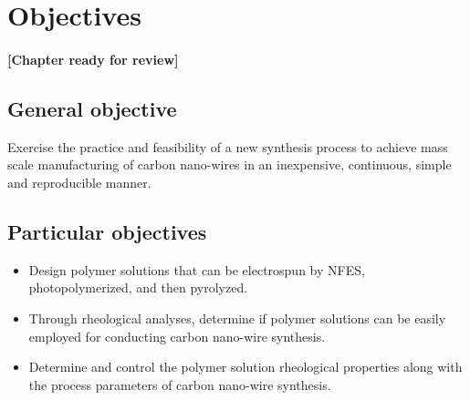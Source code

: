 
\chapter{Objectives} %

\label{Chapter:Objectives}

\subsubsection*{\color{mygray}[Chapter ready for review]}

\section{General objective}
Exercise the practice and feasibility of a new synthesis process to achieve mass scale manufacturing of carbon nano-wires in an inexpensive, continuous, simple and reproducible manner.

\section{Particular objectives}

\begin{itemize}
	\item{
	Design polymer solutions that can be electrospun by NFES, photopolymerized, and then pyrolyzed.
    }
    \item{
    Through rheological analyses, determine if polymer solutions can be easily employed for conducting carbon nano-wire synthesis.
    }
    \item{
    Determine and control the polymer solution rheological properties along with the process parameters of carbon nano-wire synthesis.
    }
\end{itemize}




